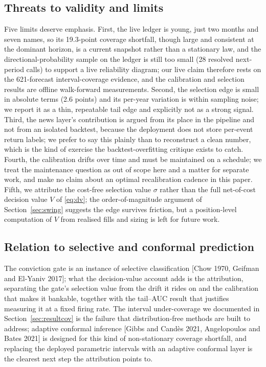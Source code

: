 \documentclass[10pt,a4paper,oneside]{article}
\theoremstyle{definition}
\theoremstyle{plain}
\begin{document}
\subsection{Threats to validity and limits}
Five limits deserve emphasis. First, the live ledger is young, just two months and seven
names, so its 19.3-point coverage shortfall, though large and consistent at the
dominant horizon, is a current snapshot rather than a stationary law, and the
directional-probability sample on the ledger is still too small (28 resolved
next-period calls) to support a live reliability diagram; our live claim therefore
rests on the 621-forecast interval-coverage evidence, and the calibration and selection
results are offline walk-forward measurements. Second, the selection edge is small in
absolute terms (2.6 points) and its per-year variation is within sampling noise; we
report it as a thin, repeatable tail edge and explicitly not as a strong signal.
Third, the news layer's contribution is argued from its place in the pipeline and not
from an isolated backtest, because the deployment does not store per-event return
labels; we prefer to say this plainly than to reconstruct a clean number, which is the
kind of exercise the backtest-overfitting critique exists to catch. Fourth, the
calibration drifts over time and must be maintained on a schedule; we treat the
maintenance question as out of scope here and a matter for separate work, and make no
claim about an optimal recalibration cadence in this paper. Fifth, we attribute the
cost-free selection value $\sigma$ rather than the full net-of-cost decision value $V$
of \eqref{eq:dv}; the order-of-magnitude argument of Section~\ref{sec:swing} suggests
the edge survives friction, but a position-level computation of $V$ from realised fills
and sizing is left for future work.

\subsection{Relation to selective and conformal prediction}
The conviction gate is an instance of selective classification [Chow 1970,
Geifman and El-Yaniv 2017]; what the decision-value account adds is the attribution,
separating the gate's selection value from the drift it rides on and the calibration
that makes it bankable, together with the tail--AUC result that justifies measuring it at a
fixed firing rate. The interval under-coverage we documented in
Section~\ref{sec:resultcov} is the failure that distribution-free methods are
built to address; adaptive conformal inference [Gibbs and Cand\`es 2021,
Angelopoulos and Bates 2021] is designed for this kind of non-stationary
coverage shortfall, and replacing the deployed parametric intervals with an adaptive
conformal layer is the clearest next step the attribution points to.
\end{document}
